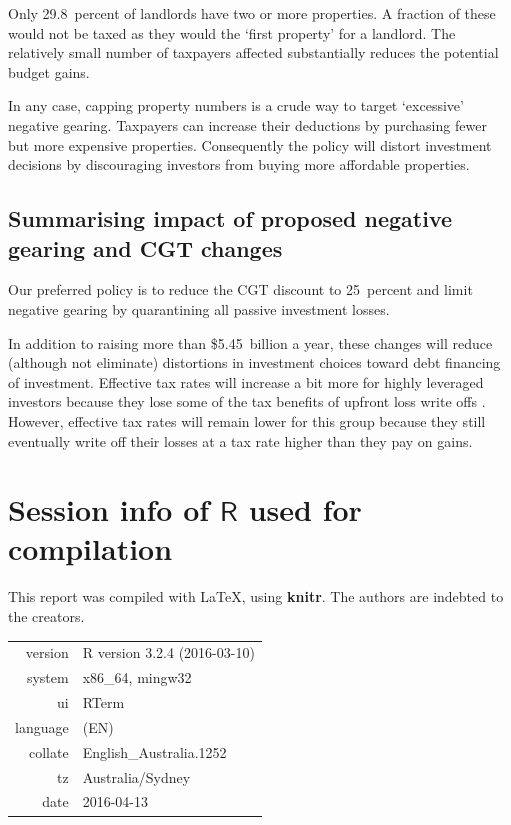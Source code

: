 \documentclass{grattan}\usepackage[]{graphicx}\usepackage[]{color}
\begin{document}
Only 29.8~percent of landlords have two or more properties.  A fraction of these would not be taxed as they would the `first property' for a landlord. The relatively small number of taxpayers affected substantially reduces the potential budget gains. 

In any case, capping property numbers is a crude way to target `excessive' negative gearing. Taxpayers can increase their deductions by purchasing fewer but more expensive properties. Consequently the policy will distort investment decisions by discouraging investors from buying more affordable properties. 

\section{Summarising impact of proposed negative gearing and CGT changes}
Our preferred policy is to reduce the CGT discount to 25~percent and limit negative gearing by quarantining all passive investment losses. 

In addition to raising more than \$5.45~billion a year, these changes will reduce (although not eliminate) distortions in investment choices toward debt financing of investment. Effective tax rates will increase a bit more for highly leveraged investors because they lose some of the tax benefits of upfront loss write offs . However, effective tax rates will remain lower for this group because they still eventually write off their losses at a tax rate higher than they pay on gains. 


\printbibliography[title=References]

\onecolumn
\appendix
\chapter{Session info of $\mathsf{R}$ used for compilation}
This report was compiled with \textrm{\LaTeX}, using \textbf{knitr}. The authors are indebted to the creators.


\begin{table}[!htb]
\centering
\begin{tabular}{rl}
  \toprule
 version & R version 3.2.4 (2016-03-10) \\ 
  system & x86\_64, mingw32 \\ 
  ui & RTerm \\ 
  language & (EN) \\ 
  collate & English\_Australia.1252 \\ 
  tz & Australia/Sydney \\ 
  date & 2016-04-13 \\ 
   \bottomrule
\end{tabular}

\end{table}
\end{document}
